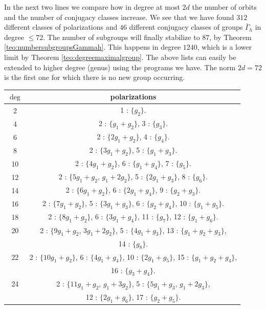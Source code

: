 \documentclass[a4paper,11pt]{article}
\begin{document}
In the next two lines we compare how in degree at most $2d$ the number of orbits and the number of conjugacy classes increase.
We see that we have found $312$ different classes of polarizations and $46$ different conjugacy classes of  groups $\bar \Gamma_h$ in degree $\leq 72$.
The number of subgroups will finally stabilize to $87$, by
Theorem \ref{teo:numbersubgroupsGammah}. This happens in degree $1240$,
 which is a lower limit by Theorem \ref{teo:degreemaximalgroup}.
 The above lists can easily be extended to higher degree (genus) using the programs we have.
The norm $2d = 72$ is the first one for which there is no new group occurring.

\begin{table}
\begin{center}

\begin{tabular}{|c|c|}
\hline
$\deg$ & polarizations \\
\hline
2 & 1 : $\{g_{2}\}$.\\
\hline
4 & 2 : $\{g_{1}+g_{2}\}$, 3 : $\{g_{3}\}$.\\
\hline
6 & 2 : $\{2g_{1}+g_{2}\}$, 4 : $\{g_{4}\}$.\\
\hline
8 & 2 : $\{3g_{1}+g_{2}\}$, 5 : $\{g_{1}+g_{3}\}$.\\
\hline
10 & 2 : $\{4g_{1}+g_{2}\}$, 6 : $\{g_{1}+g_{4}\}$, 7 : $\{g_{5}\}$.\\
\hline
12 & 2 : $\{5g_{1}+g_{2}$, $g_{1}+2g_{2}\}$, 5 : $\{2g_{1}+g_{3}\}$, 8 : $\{g_{6}\}$.\\
\hline
14 & 2 : $\{6g_{1}+g_{2}\}$, 6 : $\{2g_{1}+g_{4}\}$, 9 : $\{g_{2}+g_{3}\}$.\\
\hline
16 & 2 : $\{7g_{1}+g_{2}\}$, 5 : $\{3g_{1}+g_{3}\}$, 6 : $\{g_{2}+g_{4}\}$, 10 : $\{g_{1}+g_{5}\}$.\\
\hline
18 & 2 : $\{8g_{1}+g_{2}\}$, 6 : $\{3g_{1}+g_{4}\}$, 11 : $\{g_{7}\}$, 12 : $\{g_{1}+g_{6}\}$.\\
\hline
20 & 2 : $\{9g_{1}+g_{2}$, $3g_{1}+2g_{2}\}$, 5 : $\{4g_{1}+g_{3}\}$, 13 : $\{g_{1}+g_{2}+g_{3}\}$, \\
    & 14 : $\{g_{8}\}$.\\
\hline
22 & 2 : $\{10g_{1}+g_{2}\}$, 6 : $\{4g_{1}+g_{4}\}$, 10 : $\{2g_{1}+g_{5}\}$, 15 : $\{g_{1}+g_{2}+g_{4}\}$, \\
    & 16 : $\{g_{3}+g_{4}\}$.\\
\hline
24 & 2 : $\{11g_{1}+g_{2}$, $g_{1}+3g_{2}\}$, 5 : $\{5g_{1}+g_{3}$, $g_{1}+2g_{3}\}$, \\
    & 12 : $\{2g_{1}+g_{6}\}$, 17 : $\{g_{2}+g_{5}\}$.\\

\end{tabular}
\end{center}
\end{table}
\end{document}
